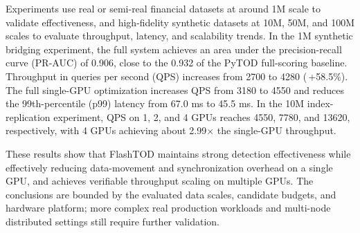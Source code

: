 \begin{abstract*}
Experiments use real or semi-real financial datasets at around 1M scale to validate effectiveness, and high-fidelity synthetic datasets at 10M, 50M, and 100M scales to evaluate throughput, latency, and scalability trends. In the 1M synthetic bridging experiment, the full system achieves an area under the precision-recall curve (PR-AUC) of 0.906, close to the 0.932 of the PyTOD full-scoring baseline. Throughput in queries per second (QPS) increases from 2700 to 4280 (\,+58.5\%). The full single-GPU optimization increases QPS from 3180 to 4550 and reduces the 99th-percentile (p99) latency from 67.0 ms to 45.5 ms. In the 10M index-replication experiment, QPS on 1, 2, and 4 GPUs reaches 4550, 7780, and 13620, respectively, with 4 GPUs achieving about 2.99$\times$ the single-GPU throughput.

These results show that FlashTOD maintains strong detection effectiveness while effectively reducing data-movement and synchronization overhead on a single GPU, and achieves verifiable throughput scaling on multiple GPUs. The conclusions are bounded by the evaluated data scales, candidate budgets, and hardware platform; more complex real production workloads and multi-node distributed settings still require further validation.
\end{abstract*}
